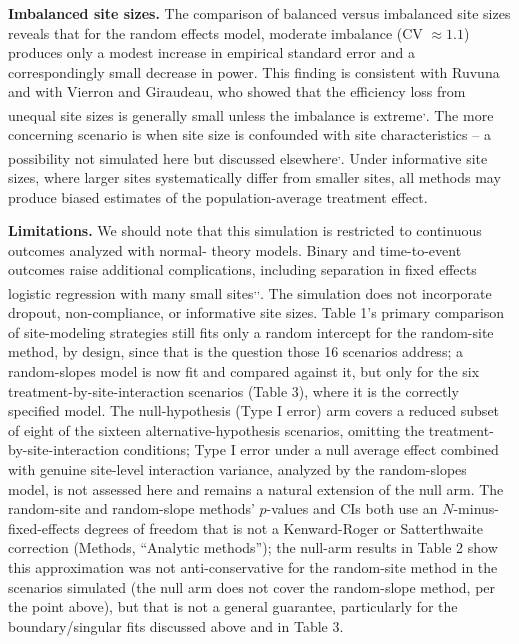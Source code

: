 \documentclass[
  11pt,
]{article}
\begin{document}
\textbf{Imbalanced site sizes.} The comparison of balanced
versus imbalanced site sizes reveals that for the random
effects model, moderate imbalance (CV \(\approx 1.1\))
produces only a modest increase in empirical standard
error and a correspondingly small decrease in power. This
finding is consistent with Ruvuna and with Vierron and
Giraudeau, who showed that the efficiency loss from unequal
site sizes is generally small unless the imbalance is extreme\textsuperscript{,}. The more concerning
scenario is when
site size is confounded with site characteristics -- a
possibility not simulated here but discussed elsewhere\textsuperscript{,}.
Under informative site sizes, where larger sites
systematically differ from smaller sites, all methods
may produce biased estimates of the population-average
treatment effect.

\textbf{Limitations.} We should note that this simulation is
restricted to continuous outcomes analyzed with normal-
theory models.
Binary and time-to-event outcomes raise additional
complications, including separation in fixed effects
logistic regression with many small sites\textsuperscript{,,}. The
simulation does not incorporate dropout, non-compliance,
or informative site sizes. Table 1's primary comparison of
site-modeling strategies still fits only a random intercept
for the random-site method, by design, since that is the
question those 16 scenarios address; a random-slopes model is
now fit and compared against it, but only for the six
treatment-by-site-interaction scenarios (Table 3), where it is
the correctly specified model. The
null-hypothesis (Type I error) arm covers a reduced subset
of eight of the sixteen alternative-hypothesis scenarios,
omitting the treatment-by-site-interaction conditions; Type
I error under a null average effect combined with genuine
site-level interaction variance, analyzed by the random-slopes
model, is not assessed here and remains a natural extension of
the null arm. The random-site and random-slope methods'
\(p\)-values and CIs
both use an \(N\)-minus-fixed-effects degrees of freedom that
is not a Kenward-Roger or Satterthwaite correction (Methods,
``Analytic methods''); the null-arm results in Table 2 show
this approximation was not anti-conservative for the
random-site method in the scenarios simulated (the null arm
does not cover the random-slope method, per the point above),
but that is not a general guarantee, particularly for the
boundary/singular fits discussed above and in Table 3.
\end{document}
